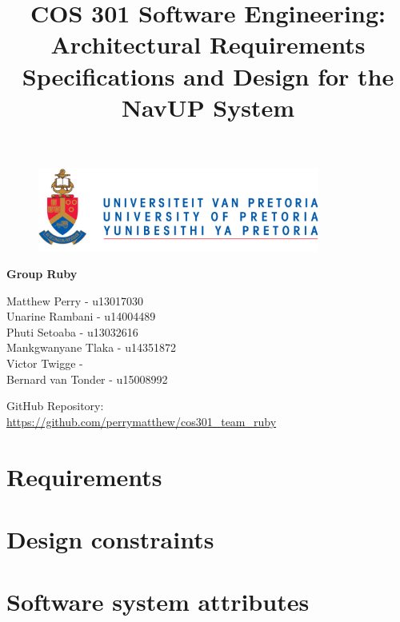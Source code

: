 \documentclass{article}
\begin{document}
		\begin{figure}[t]
			\centering
			\includegraphics[width=350px]{UP_Logo.PNG}
		\end{figure}
			\title{COS 301 Software Engineering: Architectural Requirements Specifications and Design for the NavUP System}
\maketitle
		\begin{center}
			\textbf{\newline Group Ruby} \\
		\end{center}
			
				
		\begin{flushright} \large
			Matthew Perry - u13017030 \\
			Unarine Rambani - u14004489  \\
			Phuti Setoaba -  u13032616\\
			Mankgwanyane Tlaka - u14351872  \\
			Victor Twigge -  \\
			Bernard van Tonder - u15008992  \\
		\end{flushright}
		
		
		
		
		GitHub Repository: \href{https://github.com/perrymatthew/cos301_team_ruby}\\
		\url{https://github.com/perrymatthew/cos301_team_ruby}
	

\clearpage
\tableofcontents

\clearpage
\section{Requirements}
	
\section{Design constraints}
	
\section{Software system attributes}
	
\clearpage
\end{document}
